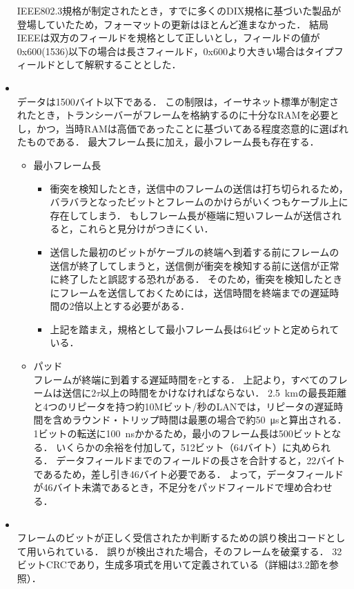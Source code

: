 \documentclass[a4paper]{ltjsarticle}
\begin{document}
\begin{itemize}
  IEEE802.3規格が制定されたとき，すでに多くのDIX規格に基づいた製品が登場していたため，フォーマットの更新はほとんど進まなかった．
  結局IEEEは双方のフィールドを規格として正しいとし，フィールドの値が0x600(1536)以下の場合は長さフィールド，0x600より大きい場合はタイプフィールドとして解釈することとした．
\item
  \\
  データは1500バイト以下である．
  この制限は，イーサネット標準が制定されたとき，トランシーバーがフレームを格納するのに十分なRAMを必要とし，かつ，当時RAMは高価であったことに基づいてある程度恣意的に選ばれたものである．
  最大フレーム長に加え，最小フレーム長も存在する．

  \begin{itemize}
  \item
    最小フレーム長

    \begin{itemize}
    \item
      衝突を検知したとき，送信中のフレームの送信は打ち切られるため，バラバラとなったビットとフレームのかけらがいくつもケーブル上に存在してしまう．
      もしフレーム長が極端に短いフレームが送信されると，これらと見分けがつきにくい．
    \item
      送信した最初のビットがケーブルの終端へ到着する前にフレームの送信が終了してしまうと，送信側が衝突を検知する前に送信が正常に終了したと誤認する恐れがある．
      そのため，衝突を検知したときにフレームを送信しておくためには，送信時間を終端までの遅延時間の2倍以上とする必要がある．
    \item 
      上記を踏まえ，規格として最小フレーム長は64ビットと定められている．
    \end{itemize}
  \item
    パッド\\
    フレームが終端に到着する遅延時間を\(\tau\)とする．
    上記より，すべてのフレームは送信に\(2\tau\)以上の時間をかけなければならない．
    \SI{2.5}{km}の最長距離と4つのリピータを持つ約10Mビット/秒のLANでは，リピータの遅延時間を含めラウンド・トリップ時間は最悪の場合で約\SI{50}{\micro s}と算出される．
    1ビットの転送に\SI{100}{\nano s}かかるため，最小のフレーム長は500ビットとなる．
    いくらかの余裕を付加して，512ビット（64バイト）に丸められる．
    データフィールドまでのフィールドの長さを合計すると，22バイトであるため，差し引き46バイト必要である．
    よって，データフィールドが46バイト未満であるとき，不足分をパッドフィールドで埋め合わせる．
  \end{itemize}
\item
  \\
  フレームのビットが正しく受信されたか判断するための誤り検出コードとして用いられている．
  誤りが検出された場合，そのフレームを破棄する．
  32ビットCRCであり，生成多項式を用いて定義されている（詳細は3.2節を参照）．
\end{itemize}
\end{document}
